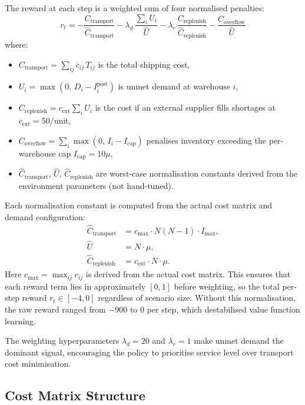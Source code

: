 \documentclass[11pt]{article}
\begin{document}
The reward at each step is a weighted sum of four normalised penalties:
\begin{equation}\label{eq:reward}
    r_t = -\frac{C_{\text{transport}}}{\hat{C}_{\text{transport}}}
          - \lambda_d \,\frac{\sum_i U_i}{\hat{U}}
          - \lambda_r \,\frac{C_{\text{replenish}}}{\hat{C}_{\text{replenish}}}
          - \frac{C_{\text{overflow}}}{\hat{U}}
\end{equation}
where:
\begin{itemize}[nosep]
    \item $C_{\text{transport}} = \sum_{ij} c_{ij}\, T_{ij}$ is the total shipping cost,
    \item $U_i = \max(0,\, D_i - I_i^{\text{post}})$ is unmet demand at warehouse $i$,
    \item $C_{\text{replenish}} = c_{\text{ext}}\sum_i U_i$ is the cost if an external supplier fills shortages at $c_{\text{ext}}=50$/unit,
    \item $C_{\text{overflow}} = \sum_i \max(0,\, I_i - I_{\text{cap}})$ penalises inventory exceeding the per-warehouse cap $I_{\text{cap}} = 10\mu$,
    \item $\hat{C}_{\text{transport}},\, \hat{U},\, \hat{C}_{\text{replenish}}$ are worst-case normalisation constants derived from the environment parameters (not hand-tuned).
\end{itemize}

Each normalisation constant is computed from the actual cost matrix and demand configuration:
\begin{align*}
    \hat{C}_{\text{transport}} &= c_{\max} \cdot N(N-1) \cdot I_{\max}, \\
    \hat{U} &= N \cdot \mu, \\
    \hat{C}_{\text{replenish}} &= c_{\text{ext}} \cdot N \cdot \mu.
\end{align*}
Here $c_{\max} = \max_{ij} c_{ij}$ is derived from the actual cost matrix. This ensures that each reward term lies in approximately $[0, 1]$ before weighting, so the total per-step reward $r_t \in [-4, 0]$ regardless of scenario size. Without this normalisation, the raw reward ranged from $-900$ to $0$ per step, which destabilised value function learning.

The weighting hyperparameters $\lambda_d = 20$ and $\lambda_r = 1$ make unmet demand the dominant signal, encouraging the policy to prioritise service level over transport cost minimisation.

\subsection{Cost Matrix Structure}
\end{document}
